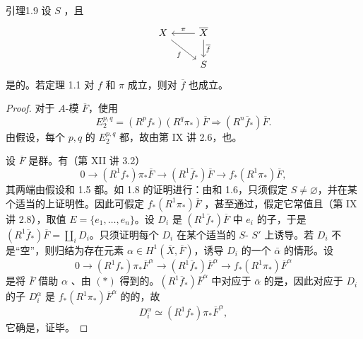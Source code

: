 \begin{SGAresult}{引理}{1.9}
设 $S$ ，且
\[
\begin{tikzcd}
X\arrow[dr,"f"']&\overline X\arrow[l,"\pi"']\arrow[d,"\overline f"]\\
&S
\end{tikzcd}
\]
是的。若定理 1.1 对 $f$ 和 $\pi$ 成立，则对 $\overline f$ 也成立。
\end{SGAresult}
\begin{proof}
对于 $A$-模 $\overline F$，使用 
\[
E_2^{p,q}=(R^pf_*)(R^q\pi_*)\overline F\Longrightarrow(R^n\overline f_*)\overline F.
\]
由假设，每个 $p,q$ 的 $E_2^{p,q}$ 都，故由第 IX 讲 2.6，也。

设 $\overline F$ 是群。有（第 XII 讲 3.2）
\[
0\longrightarrow(R^1f_*)\pi_*\overline F\longrightarrow(R^1\overline f_*)\overline F\longrightarrow f_*(R^1\pi_*)\overline F,\tag{*}
\]
其两端由假设和 1.5 都。如 1.8 的证明进行：由和 1.6，只须假定 $S\ne\varnothing$，并在某个适当的上证明性。因此可假定 $f_*(R^1\pi_*)\overline F$ ，甚至通过，假定它常值且（第 IX 讲 2.8），取值 $E=\{e_1,\ldots,e_n\}$。设 $D_i$ 是 $(R^1\overline f_*)\overline F$ 中 $e_i$ 的子，于是 $(R^1\overline f_*)\overline F=\coprod_iD_i$。只须证明每个 $D_i$ 在某个适当的 $S$- $S'$ 上诱导。若 $D_i$ 不是“空”，则归结为存在元素 $\alpha\in H^1(\overline X,\overline F)$，诱导 $D_i$ 的一个 $\bar\alpha$ 的情形。设
\[
0\longrightarrow(R^1f_*)\pi_*\overline F^\alpha
\longrightarrow(R^1\overline f_*)\overline F^\alpha
\longrightarrow f_*(R^1\pi_*)\overline F^\alpha
\]
是将 $\overline F$ 借助 $\alpha$ 、由 $(*)$ 得到的。$(R^1\overline f_*)\overline F^\alpha$ 中对应于 $\bar\alpha$ 的是，因此对应于 $D_i$ 的子 $D_i^\alpha$ 是 $f_*(R^1\pi_*)\overline F^\alpha$ 的的，故
\[
D_i^\alpha\simeq(R^1f_*)\pi_*\overline F^\alpha,
\]
它确是，证毕。
\end{proof}
